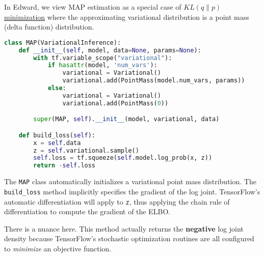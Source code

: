 In Edward, we view MAP estimation as a special case of 
\href{tut_KLqp.html}{$KL(q\|p)$ minimization} where the approximating variational
distribution is a point mass (delta function) distribution.

\begin{lstlisting}[language=Python]
class MAP(VariationalInference):
    def __init__(self, model, data=None, params=None):
        with tf.variable_scope("variational"):
            if hasattr(model, 'num_vars'):
                variational = Variational()
                variational.add(PointMass(model.num_vars, params))
            else:
                variational = Variational()
                variational.add(PointMass(0))

        super(MAP, self).__init__(model, variational, data)

    def build_loss(self):
        x = self.data
        z = self.variational.sample()
        self.loss = tf.squeeze(self.model.log_prob(x, z))
        return -self.loss  
\end{lstlisting}

The \texttt{MAP} class automatically initializes a variational point mass
distribution. The \texttt{build_loss} method implicitly specifies the gradient
of the log joint. TensorFlow's automatic differentiation will apply to \texttt
{z}, thus applying the chain rule of differentiation to compute the gradient of
the ELBO.

There is a nuance here. This method actually returns the \textbf{negative} log
joint density because TensorFlow's stochastic optimization routines are all
configured to \emph {minimize} an objective function.

